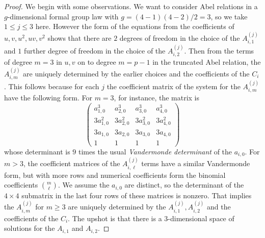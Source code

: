 \documentclass[10pt,a4paper]{amsart}
\begin{document}
\begin{proof}
We begin with some observations.  We want to consider Abel relations in a $g$-dimensional formal group law with $g = (4 - 1)(4 - 2)/2 = 3$, 
so we take $1 \le j \le 3$ here.  However the form of the equations from the coefficients of $u,v, u^2, uv, v^2$ shows that there are 
$2$ degrees of freedom in the choice of the $A_{i,1}^{(j)}$ and $1$ further degree of freedom in the choice of the $A_{i,2}^{(j)}$.  Then from the terms of degree $m = 3$ in $u,v$ on
to degree $m = p - 1$ in the truncated Abel relation, the $A_{i,m}^{(j)}$  are uniquely determined by the earlier choices and the coefficients of the $C_i$.  This follows because for
each $j$ the 
coefficient matrix of the system for the $A_{i,m}^{(j)}$ have the following form.  For $m = 3$, for instance, the matrix is
$$\begin{pmatrix}
a_{1,0}^3 & a_{2,0}^3 & a_{3,0}^3 & a_{4,0}^3\\
3 a_{1,0}^2 & 3 a_{2,0}^2 & 3 a_{3,0}^2 & 3 a_{4,0}^2\\
3 a_{1,0} & 3 a_{2,0} & 3 a_{3,0} & 3 a_{4,0}\\
1 & 1 & 1 & 1
\end{pmatrix}$$
whose determinant is $9$ times the usual \emph{Vandermonde determinant} of the $a_{i,0}$.  For $m > 3$, the coefficient matrices of the 
$A_{i,\ell}^{(j)}$ terms have a similar Vandermonde form, but with more rows and numerical coefficients form the binomial coefficients $\binom{m}{\ell}$.  
We assume the $a_{i,0}$ are distinct, so the determinant of the $4 \times 4$ submatrix in the last four rows of these matrices is nonzero.  
That implies the $A_{i,m}^{(j)}$ for $m \ge 3$ are uniquely determined by the $A_{i,1}^{(j)}, A_{i,2}^{(j)}$ and the coefficients of the $C_i$.  
The upshot is that  there is a $3$-dimensional space of solutions for the $A_{i,1}$ and $A_{i,2}$.  


\end{proof}
\end{document}
